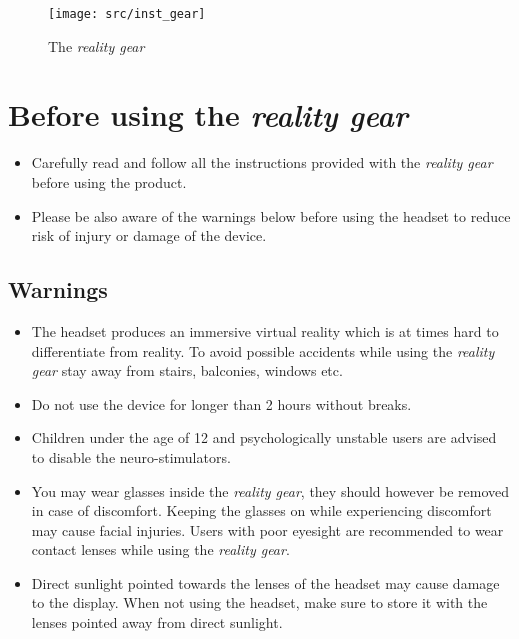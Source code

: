 \begin{figure}[!ht]
\begin{center}
\texttt{[image: src/inst\_gear]}
\end{center}
\caption[The \emph{\pokeT{} reality gear}]{The \emph{\poke{} reality gear}}
\label{gear}
\end{figure}

\newpage
\section[Before using the \emph{\pokeT{} reality gear}]{Before using the \emph{\poke{} reality gear}}
\begin{itemize}
\item Carefully read and follow all the instructions provided with the \emph{\poke{} reality gear} before using the product.
\item Please be also aware of the warnings below before using the headset to reduce risk of injury or damage of the device.
\end{itemize}

\subsection*{Warnings}
\begin{itemize}
\item The headset produces an immersive virtual reality which is at times hard to differentiate from reality. To avoid possible accidents while using the \emph{\poke{} reality gear} stay away from stairs, balconies, windows etc.
\item Do not use the device for longer than 2 hours without breaks. 
\item Children under the age of 12 and psychologically unstable users are advised to disable the neuro-stimulators.
\item You may wear glasses inside the \emph{\poke{} reality gear}, they should however be removed in case of discomfort. Keeping the glasses on while experiencing discomfort may cause facial injuries. Users with poor eyesight are recommended to wear contact lenses while using the \emph{\poke{} reality gear}.
\item Direct sunlight pointed towards the lenses of the headset may cause damage to the display. When not using the headset, make sure to store it with the lenses pointed away from direct sunlight.
\end{itemize}

